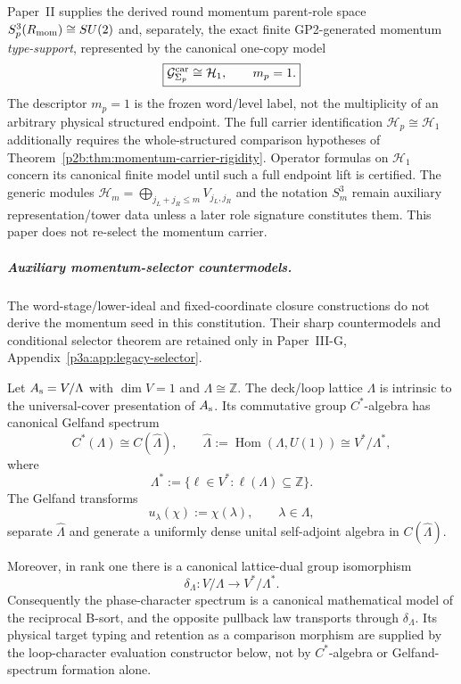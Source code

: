 \documentclass[12pt,a4paper]{article}
\begin{document}
\begin{definition}
\label{p3:def:imported-vector-momentum-constitution}
Paper~II supplies the derived round momentum parent-role space
$S^3_p(R_{\mathrm{mom}})\cong SU(2)$ and, separately, the exact finite GP2-generated momentum \emph{type-support}, represented
by the canonical one-copy model
\[
   \boxed{\mathcal G^{\rm car}_{\Sigma_p}\cong\mathcal H_1,
          \qquad m_p=1.}
\]
The descriptor $m_p=1$ is the frozen word/level label, not the
multiplicity of an arbitrary physical structured endpoint.  The full
carrier identification $\mathcal H_p\cong\mathcal H_1$ additionally
requires the whole-structured comparison hypotheses of
Theorem~\ref{p2b:thm:momentum-carrier-rigidity}.  Operator formulas on
$\mathcal H_1$ concern its canonical finite model until such a full
endpoint lift is certified.
The generic modules
$\mathcal H_m=\bigoplus_{j_L+j_R\le m}V_{j_L,j_R}$ and the notation $S^3_m$
remain auxiliary representation/tower data unless a later role signature
constitutes them.  This paper does not re-select the momentum carrier.
\end{definition}

\subparagraph{Auxiliary momentum-selector countermodels.}
The word-stage/lower-ideal and fixed-coordinate closure constructions do not
derive the momentum seed in this constitution.  Their sharp
countermodels and conditional selector theorem are retained only in
Paper~III-G, Appendix~\ref{p3a:app:legacy-selector}.

\begin{lemma}
\label{p3:lem:rank-one-lattice-dual-spectrum}
Let \(A_{\rm s}=V/\Lambda\) with \(\dim V=1\) and
\(\Lambda\cong\mathbb Z\).  The deck/loop lattice \(\Lambda\) is intrinsic to
the universal-cover presentation of \(A_{\rm s}\).  Its commutative group
\(C^*\)-algebra has canonical Gelfand spectrum
\[
        C^*(\Lambda)
        \cong
        C\!\left(\widehat\Lambda\right),
        \qquad
        \widehat\Lambda
        :=
        \operatorname{Hom}(\Lambda,U(1))
        \cong V^*/\Lambda^*,
\]
where
\[
        \Lambda^*
        :=
        \{\ell\in V^*:\ell(\Lambda)\subseteq\mathbb Z\}.
\]
The Gelfand transforms
\[
        u_\lambda(\chi):=\chi(\lambda),
        \qquad \lambda\in\Lambda,
\]
separate \(\widehat\Lambda\) and generate a uniformly dense unital
self-adjoint algebra in \(C(\widehat\Lambda)\).

Moreover, in rank one there is a canonical lattice-dual group isomorphism
\[
        \delta_\Lambda:V/\Lambda\longrightarrow V^*/\Lambda^*.
\]
Consequently the phase-character spectrum is a canonical mathematical model
of the reciprocal B-sort, and the opposite pullback law transports through
\(\delta_\Lambda\).  Its physical target typing and retention as a comparison
morphism are supplied by the loop-character evaluation constructor below, not
by \(C^*\)-algebra or Gelfand-spectrum formation alone.
\end{lemma}
\end{document}
